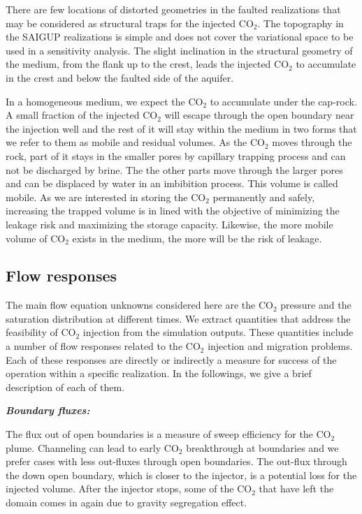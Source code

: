 There are few locations of distorted geometries in the faulted realizations that may be considered as structural traps for the injected $\mbox{CO}_2$. The topography in the SAIGUP realizations is simple and does not cover the variational space to be used in a sensitivity analysis. The slight inclination in the structural geometry of the medium, from the flank up to the crest, leads the injected $\mbox{CO}_2$  to accumulate in the crest and below the faulted side of the aquifer.

In a homogeneous medium, we expect the $\mbox{CO}_2$ to accumulate under the cap-rock. A small fraction of the injected $\mbox{CO}_2$ will escape through the open boundary near the injection well and the rest of it will stay within the medium in two forms that we refer to them as  mobile and residual volumes. As the $\mbox{CO}_2$ moves through the rock, part of it stays in the smaller pores by capillary trapping process and can not be discharged by brine. The the other parts move through the larger pores and can be displaced by water in an imbibition process. This volume is called mobile. As we are interested in storing the $\mbox{CO}_2$ permanently and safely, increasing the trapped volume is in lined with the objective of minimizing the leakage risk and maximizing the storage capacity. Likewise, the more mobile volume of $\mbox{CO}_2$ exists in the medium, the more will be the risk of leakage. 

\subsection{Flow responses}

The main flow equation unknowns considered here are the $\mbox{CO}_2$ pressure and the saturation distribution at different times. We extract quantities that address the feasibility of $\mbox{CO}_2$ injection from the simulation outputs. These quantities include a number of flow responses related to the $\mbox{CO}_2$ injection and migration problems. Each of these responses are directly or indirectly a measure for success of the operation within a specific realization. In the followings, we give a brief description of each of them.

\textbf{\textit{Boundary fluxes:}}

The flux out of open boundaries is a measure of sweep efficiency for the
CO$_2$ plume. Channeling can lead to early CO$_2$ breakthrough at boundaries and we prefer cases with less out-fluxes through open boundaries. The out-flux through the down open boundary, which is closer to the injector, is a potential loss for the injected volume. After the injector stops, some of the CO$_2$ that have left the domain comes in again due to gravity segregation effect. 

